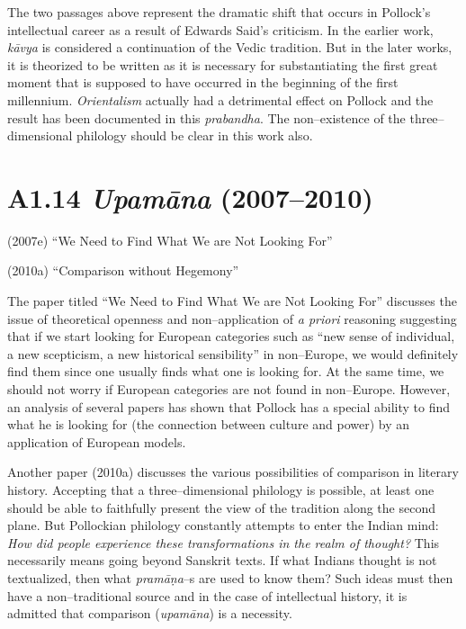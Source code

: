 The two passages above represent the dramatic shift that occurs in Pollock’s intellectual career as a result of Edwards Said’s criticism. In the earlier work, \textit{kāvya }is considered a continuation of the Vedic tradition. But in the later works, it is theorized to be written as it is necessary for substantiating the first great moment that is supposed to have occurred in the beginning of the first millennium. \textit{Orientalism} actually had a detrimental effect on Pollock and the result has been documented in this \textit{prabandha}. The non–existence of the three–dimensional philology should be clear in this work also.

\vspace{-.5cm}

\section*{A1.14 {\it{\textbf{Upamāna}}} (2007–2010)}

\vspace{-.3cm}

(2007e) “We Need to Find What We are Not Looking For”

(2010a) “Comparison without Hegemony”

The paper titled “We Need to Find What We are Not Looking For” discusses the issue of theoretical openness and non–application of \textit{a priori} reasoning suggesting that if we start looking for European categories such as “new sense of individual, a new scepticism, a new historical sensibility” in non–Europe, we would definitely find them since one usually finds what one is looking for. At the same time, we should not worry if European categories are not found in non–Europe. However, an analysis of several papers has shown that Pollock has a special ability to find what he is looking for (the connection between culture and power) by an application of European models.

Another paper (2010a) discusses the various possibilities of comparison in literary history. Accepting that a three–dimensional philology is possible, at least one should be able to faithfully present the view of the tradition along the second plane. But Pollockian philology constantly attempts to enter the Indian mind:\textit{ How did people experience these transformations in the realm of thought?} This necessarily means going beyond Sanskrit texts. If what Indians thought is not textualized, then what \textit{pramāṇa}–s are used to know them? Such ideas must then have a non–traditional source and in the case of intellectual history, it is admitted that comparison (\textit{upamāna}) is a necessity.

